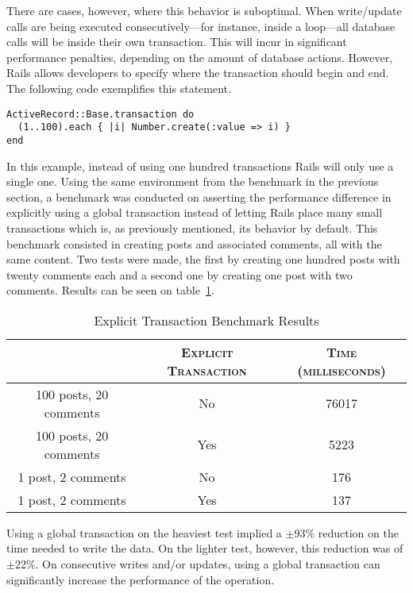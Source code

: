 There are cases, however, where this behavior is suboptimal. When write/update calls are being executed consecutively---for instance, inside a loop---all database calls will be inside their own transaction. This will incur in significant performance penalties, depending on the amount of database actions. However, Rails allows developers to specify where the transaction should begin and end. The following code exemplifies this statement.
\begin{lstlisting}[xleftmargin=30pt,xrightmargin=30pt]
ActiveRecord::Base.transaction do
  (1..100).each { |i| Number.create(:value => i) }
end
\end{lstlisting}
In this example, instead of using one hundred transactions Rails will only use a single one. Using the same environment from the benchmark in the previous section, a benchmark was conducted on asserting the performance difference in explicitly using a global transaction instead of letting Rails place many small transactions which is, as previously mentioned, its behavior by default. This benchmark consisted in creating posts and associated comments, all with the same content. Two tests were made, the first by creating one hundred posts with twenty comments each and a second one by creating one post with two comments. Results can be seen on table~\ref{tab:transaction}.
\begin{table}[h!t]
  \centering
  \caption{Explicit Transaction Benchmark Results}
  \label{tab:transaction}
  
  \begin{tabular}{c|c|c}
  
    & \textbf{\textsc{Explicit Transaction}} & \textbf{\textsc{Time (milliseconds)}} \\ \hline
    100 posts, 20 comments & No & 76017 \\ \hline
    100 posts, 20 comments & Yes & 5223 \\ \hline
    1 post, 2 comments & No & 176 \\ \hline
    1 post, 2 comments & Yes & 137 \\
  \end{tabular}
\end{table}

Using a global transaction on the heaviest test implied a $\pm$93\% reduction on the time needed to write the data. On the lighter test, however, this reduction was of $\pm$22\%. On consecutive writes and/or updates, using a global transaction can significantly increase the performance of the operation.


